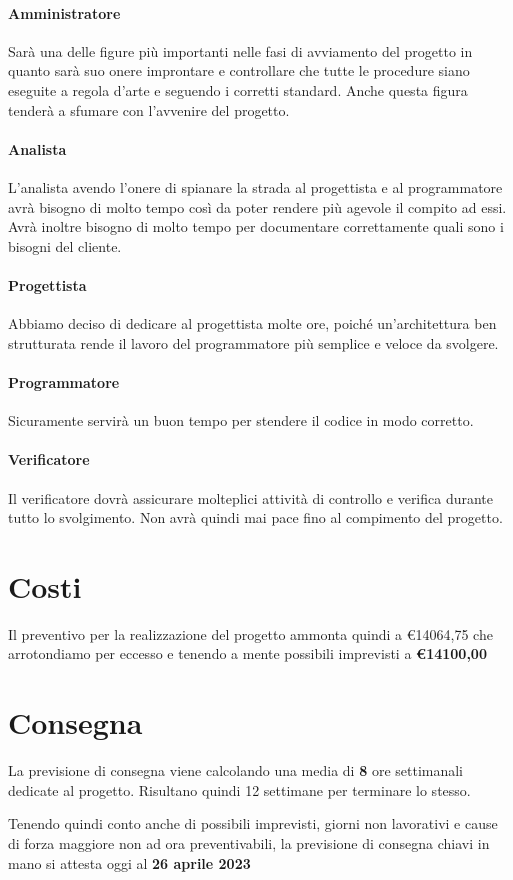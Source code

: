 \paragraph{Amministratore} Sarà una delle figure più importanti nelle fasi di avviamento del progetto in quanto sarà suo onere improntare e controllare che tutte le procedure siano eseguite a regola d'arte e seguendo i corretti standard. Anche questa figura tenderà a sfumare con l'avvenire del progetto.

\paragraph{Analista}L'analista avendo l'onere di spianare la strada al progettista e al programmatore avrà bisogno di molto tempo così da poter rendere più agevole il compito ad essi. Avrà inoltre bisogno di molto tempo per documentare correttamente quali sono i bisogni del cliente.

\paragraph{Progettista} Abbiamo deciso di dedicare al progettista molte ore, poiché un'architettura ben strutturata rende il lavoro del programmatore più semplice e veloce da svolgere.

\paragraph{Programmatore} Sicuramente servirà un buon tempo per stendere il codice in modo corretto.

\paragraph{Verificatore} Il verificatore dovrà assicurare molteplici attività di controllo e verifica durante tutto lo svolgimento. Non avrà quindi mai pace fino al compimento del progetto.

\section{Costi}

Il preventivo per la realizzazione del progetto ammonta quindi a €14064,75 che arrotondiamo per eccesso e tenendo a mente possibili imprevisti a \textbf{€14100,00}

\section{Consegna}

La previsione di consegna viene calcolando una media di \textbf{8} ore settimanali dedicate al progetto. Risultano quindi 12 settimane per terminare lo stesso.

Tenendo quindi conto anche di possibili imprevisti, giorni non lavorativi e cause di forza maggiore non ad ora preventivabili, la previsione di consegna chiavi in mano si attesta oggi al \textbf{26 aprile 2023}